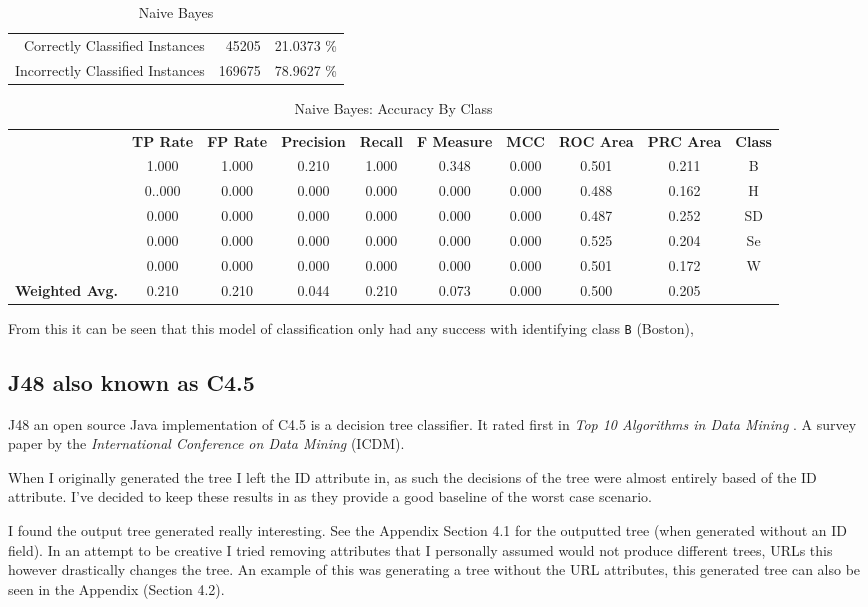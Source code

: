 \documentclass[a4paper]{article}
\begin{document}
\begin{table}[H]
\centering
\caption{Naive Bayes}
\label{my-label}
  \begin{tabular}{rrr}
    Correctly Classified Instances & 45205 & 21.0373 \% \\
    Incorrectly Classified Instances & 169675 & 78.9627 \% \\
  \end{tabular}
\end{table}
\begin{table}[H]
\centering
\caption{Naive Bayes: Accuracy By Class}
\label{my-label}
  \begin{tabular}{cccccccccc}
&\textbf{TP Rate}&\textbf{FP Rate}&\textbf{Precision}&\textbf{Recall}&\textbf{F Measure}&\textbf{MCC}&\textbf{ROC Area}&\textbf{PRC Area}&\textbf{Class}\\
&1.000&1.000&0.210&1.000&0.348&0.000&0.501&0.211&B\\
&0..000&0.000&0.000&0.000&0.000&0.000&0.488&0.162&H\\
&0.000&0.000&0.000&0.000&0.000&0.000&0.487&0.252&SD\\
&0.000&0.000&0.000&0.000&0.000&0.000&0.525&0.204&Se\\
&0.000&0.000&0.000&0.000&0.000&0.000&0.501&0.172&W\\
\textbf{Weighted Avg.}&0.210&0.210&0.044&0.210&0.073&0.000&0.500&0.205&\\
  \end{tabular}
\end{table}
From this it can be seen that this model of classification only had any success with identifying class \texttt{B} (Boston),

\subsection{J48 also known as C4.5}
J48 an open source Java implementation of C4.5 is a decision tree classifier. It rated first in \textit{Top 10 Algorithms in Data Mining} \cite{wu2008top}. A survey paper by the \textit{International Conference on Data Mining} (ICDM).

When I originally generated the tree I left the ID attribute in, as such the decisions of the tree were almost entirely based of the ID attribute. I've decided to keep these results in as they provide a good baseline of the worst case scenario.

I found the output tree generated really interesting. See the Appendix Section 4.1 for the outputted tree (when generated without an ID field). In an attempt to be creative I tried removing attributes that I personally assumed would not produce different trees, URLs this however drastically changes the tree. An example of this was generating a tree without the URL attributes, this generated tree can also be seen in the Appendix (Section 4.2).
\end{document}
